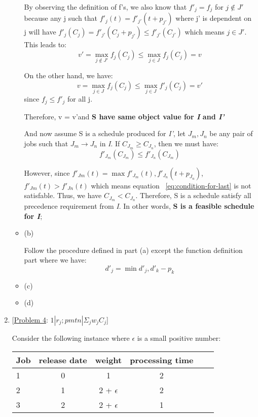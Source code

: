 \documentclass[12pt]{article}
\begin{document}
\begin{enumerate}
\begin{itemize}
By observing the definition of f's, we also know that $f'_{j} = f_{j}$ for $j \not\in J'$ because any j such that $f'_{j}(t) = f'_{j'}(t + p_{j'})$ where j' is dependent on j will have $f'_{j}(C_{j}) = f'_{j'}(C_{j} + p_{j'}) \leq f'_{j'}(C_{j'})$ which means $j \in J'$. This leads to:
\begin{equation}
v' = \max\limits_{j \not\in J'} {f_{j}(C_{j})} \leq \max\limits_{j \in J} {f_{j}(C_{j})} = v
\end{equation}

On the other hand, we have:
\begin{equation}
v = \max\limits_{j \in J} {f_{j}(C_{j})} \leq \max\limits_{j \in J} {f'_{j}(C_{j})} = v'
\end{equation}
since $f_{j} \leq f'_{j}$ for all j.

Therefore, v = v'and \textbf{S have same object value for {\it I} and {\it I'}}

And now assume S is a schedule produced for {\it I'}, let $J_{m}, J_{n}$ be any pair of jobs such that $J_{m} \to J_{n}$ in {\it I}. If $C_{J_{m}} \geq C_{J_{n}}$, then we must have:
\begin{equation} \label{eq:condition-for-last}
f'_{J_{m}}(C_{J_{m}}) \leq f'_{J_{n}}(C_{J_{m}})
\end{equation}

However, since $f'_{J{m}}(t) = \max{f'_{J_{m}}(t), f'_{J_{n}}(t + p_{J_{n}})}$, $f'_{J{m}}(t) > f'_{J{n}}(t)$ which means equation ~\ref{eq:condition-for-last} is not satisfable. Thus, we have $C_{J_{m}} < C_{J_{n}}$. Therefore, S is a schedule satisfy all precedence requirement from {\it I}. In other words, \textbf{S is a feasible schedule for {\it I}};

\item{(b)}

Follow the procedure defined in part (a) except the function definition part where we have:
\begin{equation}
d'_{j} = \min{d'_{j}, d'_{k} - p_{k}}
\end{equation}

\item{(c)}
\item{(d)}

\end{itemize}

\medskip

\item{} [\underline{Problem 4}: $1|r_{j}; pmtn|\Sigma_{j} w_{j}C_{j}$]

Consider the following instance where $\epsilon$ is a small positive number:
\begin{center}
\begin{tabular}{l*{4}{c}r}
Job  & release date & weight & processing time \\
\hline
1    & 0 & 1 & 2               \\
2    & 1 & 2 + $\epsilon$ & 2  \\
3    & 2 & 2 + $\epsilon$ & 1  \\
\end{tabular}
\end{center}


\end{enumerate}
\end{document}
